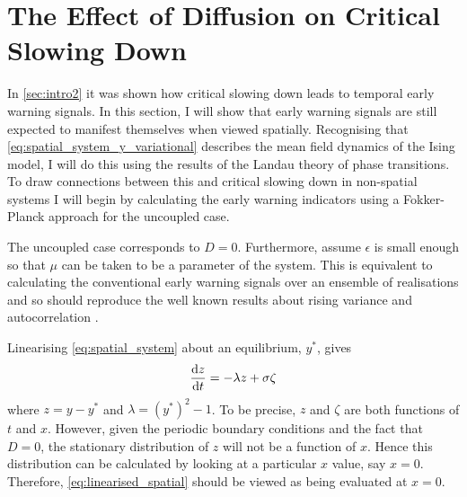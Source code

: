 \section{The Effect of Diffusion on Critical Slowing Down}
\label{sec:spatial_csd}
In \cref{sec:intro2} it was shown how critical slowing down leads to temporal early warning signals. In this section, I will show that early warning signals are still expected
to manifest themselves when viewed spatially. Recognising that \cref{eq:spatial_system_y_variational} describes the mean field dynamics of
the Ising model, I will do this using the results of the Landau theory of phase transitions. To draw connections between this and critical slowing down in non-spatial systems
I will begin by calculating the early warning indicators using a Fokker-Planck approach for the uncoupled case.

The uncoupled case corresponds to  $D = 0$. Furthermore, assume $\epsilon$ is small enough so that $\mu$ can be taken to be a parameter of the system.
This is equivalent to calculating the conventional early warning signals over an ensemble of realisations and so should reproduce the well known results about rising variance
and autocorrelation \parencite{Dakos2008}.

Linearising \cref{eq:spatial_system} about an equilibrium, $y^*$, gives
\begin{equation}
  \label{eq:linearised_spatial}
  \dv{z}{t} = -\lambda z + \sigma \zeta
\end{equation}
where $z = y - y^*$ and $\lambda = (y^*)^2 - 1$. To be precise, $z$ and $\zeta$ are both functions of $t$ and $x$. However, given the periodic boundary conditions and the
fact that $D = 0$, the stationary distribution of $z$ will not be a function of $x$. Hence this distribution can be calculated by looking at a particular $x$ value, say $x = 0$.
Therefore, \cref{eq:linearised_spatial} should be viewed as being evaluated at $x = 0$.

